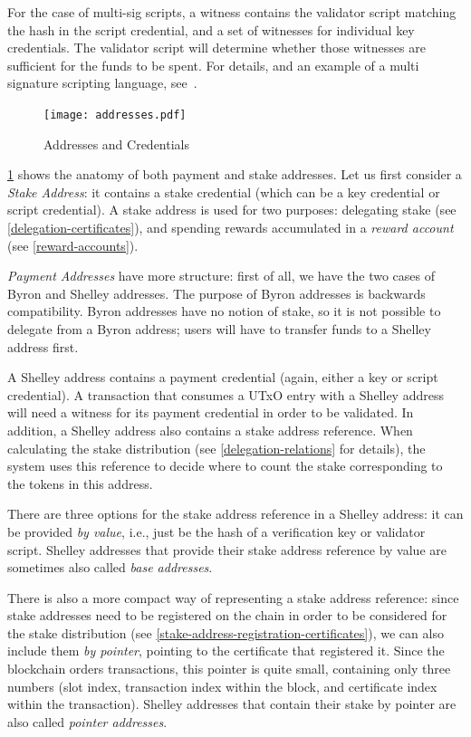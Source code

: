\documentclass[11pt,a4paper,dvipsnames,twosided]{article}
\newcommand{\citep}[1]{\cite{#1}}
\begin{document}
For the case of multi-sig scripts, a witness contains the validator script
matching the hash in the script credential, and a set of witnesses for
individual key credentials. The validator script will determine whether those
witnesses are sufficient for the funds to be spent. For details, and an example
of a multi signature scripting language, see~\citep{multi-sig-scripts}.

\begin{figure}[ht]
  \texttt{[image: addresses.pdf]}
  \caption{Addresses and Credentials}
  \label{fig:addresses}
\end{figure}

\cref{fig:addresses} shows the anatomy of both payment and stake addresses. Let
us first consider a \emph{Stake Address}: it contains a stake credential (which
can be a key credential or script credential). A stake address is used for two
purposes: delegating stake (see \cref{delegation-certificates}), and spending
rewards accumulated in a \emph{reward account} (see \cref{reward-accounts}).

\emph{Payment Addresses} have more structure: first of all, we have the two
cases of Byron and Shelley addresses. The purpose of Byron addresses is
backwards compatibility. Byron addresses have no notion of stake, so it is not
possible to delegate from a Byron address; users will have to transfer funds to
a Shelley address first.

A Shelley address contains a payment credential (again, either a key or script
credential). A transaction that consumes a UTxO entry with a Shelley address
will need a witness for its payment credential in order to be validated. In
addition, a Shelley address also contains a stake address reference. When
calculating the stake distribution (see \cref{delegation-relations} for
details), the system uses this reference to decide where to count the stake
corresponding to the tokens in this address.

There are three options for the stake address reference in a Shelley address: it
can be provided \emph{by value}, i.e., just be the hash of a verification key or
validator script. Shelley addresses that provide their stake address reference
by value are sometimes also called \emph{base addresses}.

There is also a more compact way of representing a stake address reference: since stake
addresses need to be registered on the chain in order to be considered for the
stake distribution (see \cref{stake-address-registration-certificates}), we can
also include them \emph{by pointer}, pointing to the certificate that
registered it. Since the
blockchain orders transactions, this pointer is quite small, containing only
three numbers (slot index, transaction index within the block, and certificate
index within the transaction). Shelley addresses that contain their stake
 by pointer are also called \emph{pointer addresses}.
\end{document}
